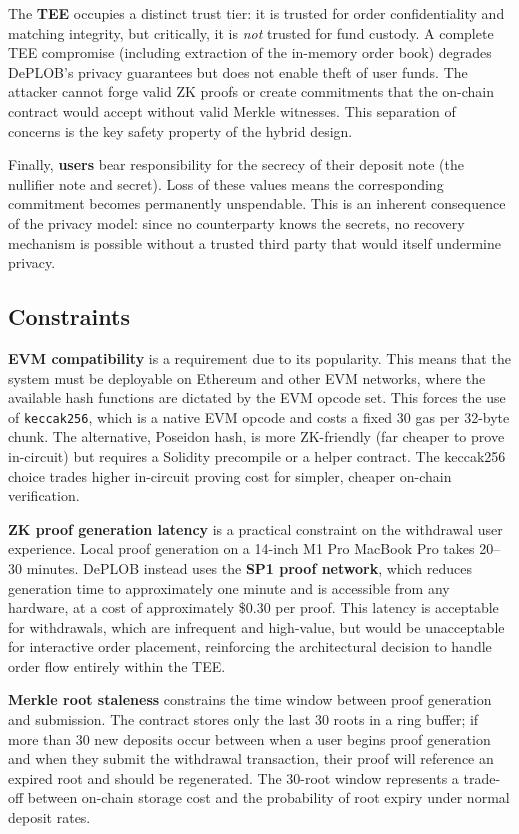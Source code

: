 \documentclass[12pt,a4paper]{article}
\begin{document}
The \textbf{TEE} occupies a distinct trust tier: it is trusted for order confidentiality and matching integrity, but critically, it is \textit{not} trusted for fund custody. A complete TEE compromise (including extraction of the in-memory order book) degrades DePLOB's privacy guarantees but does not enable theft of user funds. The attacker cannot forge valid ZK proofs or create commitments that the on-chain contract would accept without valid Merkle witnesses. This separation of concerns is the key safety property of the hybrid design.

Finally, \textbf{users} bear responsibility for the secrecy of their deposit note (the nullifier note and secret). Loss of these values means the corresponding commitment becomes permanently unspendable. This is an inherent consequence of the privacy model: since no counterparty knows the secrets, no recovery mechanism is possible without a trusted third party that would itself undermine privacy.

\subsection{Constraints}

\textbf{EVM compatibility} is a requirement due to its popularity. This means that the system must be deployable on Ethereum and other EVM networks, where the available hash functions are dictated by the EVM opcode set. This forces the use of \texttt{keccak256}, which is a native EVM opcode and costs a fixed 30 gas per 32-byte chunk. The alternative, Poseidon hash, is more ZK-friendly (far cheaper to prove in-circuit) but requires a Solidity precompile or a helper contract. The keccak256 choice trades higher in-circuit proving cost for simpler, cheaper on-chain verification.

\textbf{ZK proof generation latency} is a practical constraint on the withdrawal user experience. Local proof generation on a 14-inch M1 Pro MacBook Pro takes 20--30 minutes. DePLOB instead uses the \textbf{SP1 proof network}, which reduces generation time to approximately one minute and is accessible from any hardware, at a cost of approximately \$0.30 per proof. This latency is acceptable for withdrawals, which are infrequent and high-value, but would be unacceptable for interactive order placement, reinforcing the architectural decision to handle order flow entirely within the TEE.

\textbf{Merkle root staleness} constrains the time window between proof generation and submission. The contract stores only the last 30 roots in a ring buffer; if more than 30 new deposits occur between when a user begins proof generation and when they submit the withdrawal transaction, their proof will reference an expired root and should be regenerated. The 30-root window represents a trade-off between on-chain storage cost and the probability of root expiry under normal deposit rates.
\end{document}
